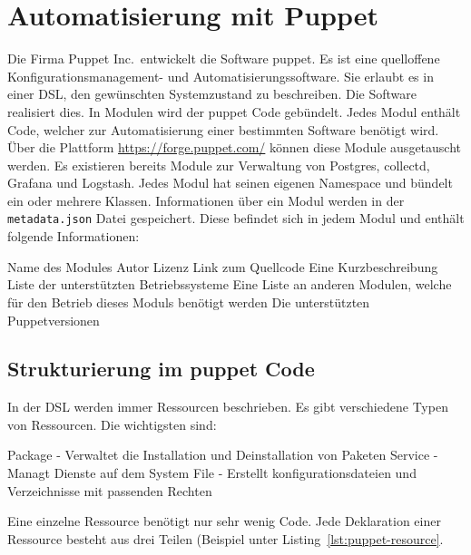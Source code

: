 \section{Automatisierung mit Puppet}
Die Firma Puppet Inc.\ entwickelt die Software puppet. Es ist eine quelloffene
Konfigurationsmanagement\hyp{} und Automatisierungssoftware. Sie erlaubt es in
einer  \gls{DSL}, den
gewünschten Systemzustand zu beschreiben. Die Software realisiert dies. In
Modulen wird der puppet Code gebündelt. Jedes Modul enthält Code, welcher zur
Automatisierung einer bestimmten Software benötigt wird. Über die Plattform
\url{https://forge.puppet.com/} können diese Module ausgetauscht werden. Es
existieren bereits Module zur Verwaltung von Postgres, collectd, Grafana und
Logstash. Jedes Modul hat seinen eigenen \gls{Namespace} und bündelt ein oder
mehrere Klassen. Informationen über ein Modul werden in der
\texttt{metadata.json} Datei gespeichert. Diese befindet sich in jedem Modul
und enthält folgende Informationen:

\begin{outline}
  \1 Name des Modules
  \1 Autor
  \1 Lizenz
  \1 Link zum Quellcode
  \1 Eine Kurzbeschreibung
  \1 Liste der unterstützten Betriebssysteme
  \1 Eine Liste an anderen Modulen, welche für den Betrieb dieses Moduls
  benötigt werden
  \1 Die unterstützten Puppetversionen
\end{outline}
\tm%

\subsection{Strukturierung im puppet Code}
In der \gls{DSL} werden immer Ressourcen beschrieben. Es gibt verschiedene
Typen von Ressourcen. Die wichtigsten sind:

\begin{outline}
  \1 Package \hyp{} Verwaltet die Installation und Deinstallation von Paketen
  \1 Service \hyp{} Managt Dienste auf dem System
  \1 File \hyp{} Erstellt konfigurationsdateien und Verzeichnisse mit passenden
  Rechten
\end{outline}

Eine einzelne Ressource benötigt nur sehr wenig Code. Jede Deklaration einer
Ressource besteht aus drei Teilen (Beispiel unter
Listing~\ref{lst:puppet-resource}.

